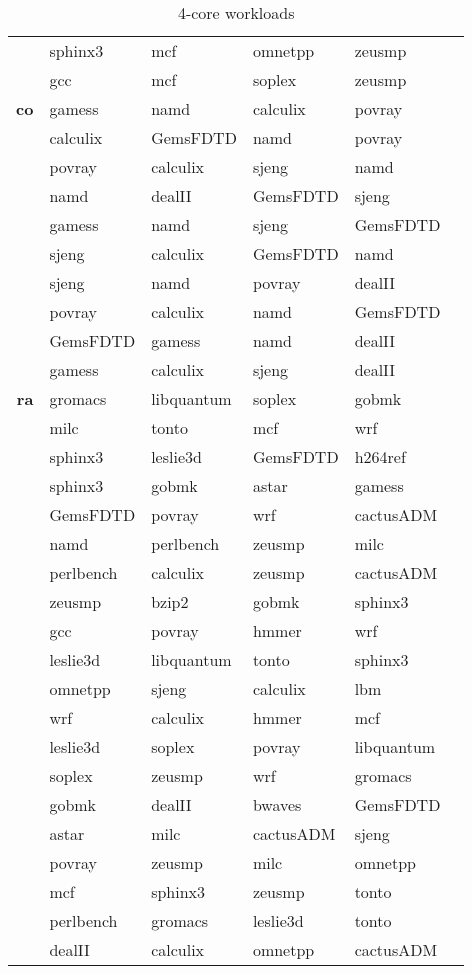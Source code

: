 \begin{table}[ht]
{\begin{tabular}{|r|l|llll|}
			 & sphinx3 & mcf & omnetpp & zeusmp \\ 
			 & gcc & mcf & soplex & zeusmp \\ 
\textbf{co}	 & gamess & namd & calculix & povray \\ 
			 & calculix & GemsFDTD & namd & povray \\ 
			 & povray & calculix & sjeng & namd \\ 
			 & namd & dealII & GemsFDTD & sjeng \\ 
			 & gamess & namd & sjeng & GemsFDTD \\ 
			 & sjeng & calculix & GemsFDTD & namd \\ 
			 & sjeng & namd & povray & dealII \\ 
			 & povray & calculix & namd & GemsFDTD \\ 
			 & GemsFDTD & gamess & namd & dealII \\ 
			 & gamess & calculix & sjeng & dealII \\ 
\textbf{ra}	 & gromacs & libquantum & soplex & gobmk \\ 
			 & milc & tonto & mcf & wrf \\ 
			 & sphinx3 & leslie3d & GemsFDTD & h264ref \\ 
			 & sphinx3 & gobmk & astar & gamess \\ 
			 & GemsFDTD & povray & wrf & cactusADM \\ 
			 & namd & perlbench & zeusmp & milc \\ 
			 & perlbench & calculix & zeusmp & cactusADM \\ 
			 & zeusmp & bzip2 & gobmk & sphinx3 \\ 
			 & gcc & povray & hmmer & wrf \\ 
			 & leslie3d & libquantum & tonto & sphinx3 \\ 
			 & omnetpp & sjeng & calculix & lbm \\ 
			 & wrf & calculix & hmmer & mcf \\ 
			 & leslie3d & soplex & povray & libquantum \\ 
			 & soplex & zeusmp & wrf & gromacs \\ 
			 & gobmk & dealII & bwaves & GemsFDTD \\ 
			 & astar & milc & cactusADM & sjeng \\ 
			 & povray & zeusmp & milc & omnetpp \\ 
			 & mcf & sphinx3 & zeusmp & tonto \\ 
			 & perlbench & gromacs & leslie3d & tonto \\ 
			 & dealII & calculix & omnetpp & cactusADM \\ 
\hline
\end{tabular}%
} 
\caption{4-core workloads}
\label{tbl:workloads}
\end{table}
